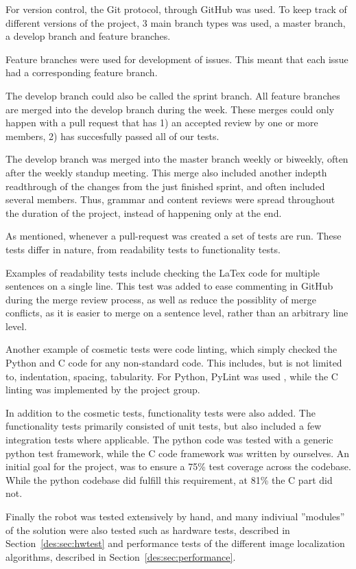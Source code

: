 For version control, the Git protocol, through GitHub was used.
To keep track of different versions of the project, 3 main branch types was used, a master branch, a develop branch and feature branches.

Feature branches were used for development of issues.
This meant that each issue had a corresponding feature branch.

The develop branch could also be called the sprint branch.
All feature branches are merged into the develop branch during the week.
These merges could only happen with a pull request that has 1) an accepted review by one or more members, 2) has succesfully passed all of our tests.

The develop branch was merged into the master branch weekly or biweekly, often after the weekly standup meeting.
This merge also included another indepth readthrough of the changes from the just finished sprint, and often included several members.
Thus, grammar and content reviews were spread throughout the duration of the project, instead of happening only at the end.

As mentioned, whenever a pull-request was created a set of tests are run.
These tests differ in nature, from readability tests to functionality tests.

Examples of readability tests include checking the LaTex code for multiple sentences on a single line.
This test was added to ease commenting in GitHub during the merge review process, as well as reduce the possiblity of merge conflicts, as it is easier to merge on a sentence level, rather than an arbitrary line level.

Another example of cosmetic tests were code linting, which simply checked the Python and C code for any non-standard code.
This includes, but is not limited to, indentation, spacing, tabularity.
For Python, PyLint was used , while the C linting was implemented by the project group.

In addition to the cosmetic tests, functionality tests were also added.
The functionality tests primarily consisted of unit tests, but also included a few integration tests where applicable.
The python code was tested with  a generic python test framework, while the C code framework was written by ourselves.
An initial goal for the project, was to ensure a 75\% test coverage across the codebase.
While the python codebase did fulfill this requirement, at 81\% the C part did not.

Finally the robot was tested extensively by hand, and many indiviual ''modules'' of the solution were also tested such as hardware tests, described in Section~\ref{des:sec:hwtest} and
performance tests of the different image localization algorithms, described in Section~\ref{des:sec:performance}.
